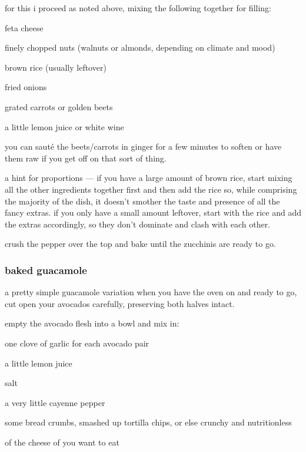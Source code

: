 for this i proceed as noted above, mixing the following together for filling:

\begin{ingredients}
  \item feta cheese
  \item finely chopped nuts (walnuts or almonds, depending on climate and mood)
  \item brown rice (usually leftover)
  \item fried onions
  \item grated carrots or golden beets
  \item a little lemon juice or white wine
\end{ingredients}

you can saut\'{e} the beets/carrots in ginger for a few minutes to soften or 
have them raw if you get off on that sort of thing. 

a hint for proportions --- if you have a large amount of brown rice, start 
mixing all the other ingredients together first and then add the rice so, 
while comprising the majority of the dish, it doesn't smother the taste and 
presence of all the fancy extras. if you only have a small amount leftover, 
start with the rice and add the extras accordingly, so they don't dominate and 
clash with each other.

crush the pepper over the top and bake until the zucchinis are ready to go.

\subsubsection{baked guacamole}

a pretty simple guacamole variation when you have the oven on and ready to go, 
cut open your avocados carefully, preserving both halves intact.

empty the avocado flesh into a bowl and mix in:

\begin{ingredients}
  \item one clove of garlic for each avocado pair
  \item a little lemon juice
  \item salt
  \item a very little cayenne pepper
  \item some bread crumbs, smashed up tortilla chips, or  else crunchy and nutritionless
  \item \onehalf of the cheese of you want to eat
\end{ingredients}

